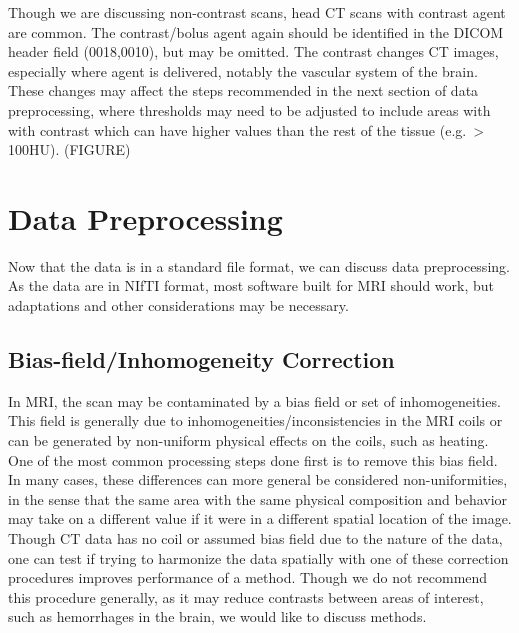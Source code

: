 \documentclass[]{elsarticle} %
\begin{document}
Though we are discussing non-contrast scans, head CT scans with contrast
agent are common. The contrast/bolus agent again should be identified in
the DICOM header field (0018,0010), but may be omitted. The contrast
changes CT images, especially where agent is delivered, notably the
vascular system of the brain. These changes may affect the steps
recommended in the next section of data preprocessing, where thresholds
may need to be adjusted to include areas with with contrast which can
have higher values than the rest of the tissue (e.g.~\textgreater{}
100HU). (FIGURE)

\hypertarget{data-preprocessing}{%
\section{Data Preprocessing}\label{data-preprocessing}}

Now that the data is in a standard file format, we can discuss data
preprocessing. As the data are in NIfTI format, most software built for
MRI should work, but adaptations and other considerations may be
necessary.

\hypertarget{bias-fieldinhomogeneity-correction}{%
\subsection{Bias-field/Inhomogeneity
Correction}\label{bias-fieldinhomogeneity-correction}}

In MRI, the scan may be contaminated by a bias field or set of
inhomogeneities. This field is generally due to
inhomogeneities/inconsistencies in the MRI coils or can be generated by
non-uniform physical effects on the coils, such as heating. One of the
most common processing steps done first is to remove this bias field. In
many cases, these differences can more general be considered
non-uniformities, in the sense that the same area with the same physical
composition and behavior may take on a different value if it were in a
different spatial location of the image. Though CT data has no coil or
assumed bias field due to the nature of the data, one can test if trying
to harmonize the data spatially with one of these correction procedures
improves performance of a method. Though we do not recommend this
procedure generally, as it may reduce contrasts between areas of
interest, such as hemorrhages in the brain, we would like to discuss
methods.
\end{document}
